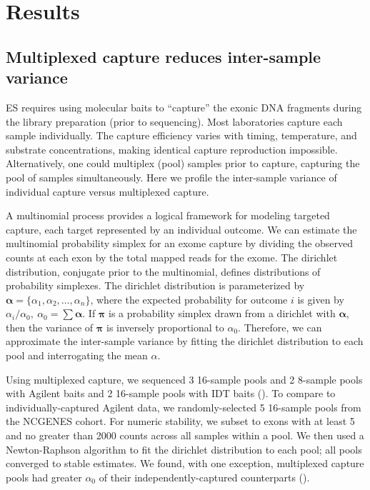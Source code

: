 \documentclass{article}\usepackage[]{graphicx}\usepackage[]{color}
\begin{document}

\section{Results}

\subsection{Multiplexed capture reduces inter-sample variance}

ES requires using molecular baits to ``capture'' the exonic DNA fragments during the library preparation (prior to sequencing).
Most laboratories capture each sample individually.
The capture efficiency varies with timing, temperature, and substrate concentrations, making identical capture reproduction impossible.
Alternatively, one could multiplex (pool) samples prior to capture, capturing the pool of samples simultaneously.
Here we profile the inter-sample variance of individual capture versus multiplexed capture.

A multinomial process provides a logical framework for modeling targeted capture, each target represented by an individual outcome.
We can estimate the multinomial probability simplex for an exome capture by dividing the observed counts at each exon by the total mapped reads for the exome.
The dirichlet distribution, conjugate prior to the multinomial, defines distributions of probability simplexes.
The dirichlet distribution is parameterized by $\bm{\alpha} = \{\alpha_1, \alpha_2, \dots, \alpha_n\}$, where the expected probability for outcome $i$ is given by $\alpha_i/\alpha_0,~\alpha_0 = \sum \bm\alpha$.
If $\bm\pi$ is a probability simplex drawn from a dirichlet with $\bm\alpha$, then the variance of $\bm\pi$ is inversely proportional to $\alpha_0$.
Therefore, we can approximate the inter-sample variance by fitting the dirichlet distribution to each pool and interrogating the mean $\alpha$.



Using multiplexed capture, we sequenced 3 16-sample pools and 2 8-sample pools with Agilent baits and 2 16-sample pools with IDT baits ().
To compare to individually-captured Agilent data, we randomly-selected 5 16-sample pools from the NCGENES cohort.
For numeric stability, we subset to exons with at least 5 and no greater than 2000 counts across all samples within a pool.
We then used a Newton-Raphson algorithm \cite{minka:2000aa} to fit the dirichlet distribution to each pool; all pools converged to stable estimates.
We found, with one exception, multiplexed capture pools had greater $\alpha_0$ of their independently-captured counterparts ().
\end{document}
